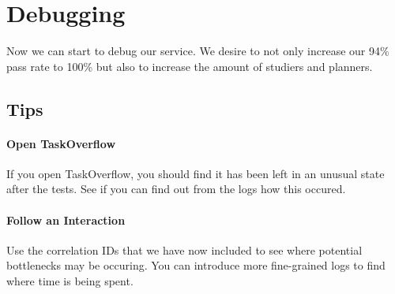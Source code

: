 \documentclass{csse4400}
\begin{document}
\section{Debugging}

Now we can start to debug our service.
We desire to not only increase our 94\% pass rate to 100\% but also to increase the amount of studiers and planners.

\subsection{Tips}

\paragraph{Open TaskOverflow}
If you open TaskOverflow,
you should find it has been left in an unusual state after the tests.
See if you can find out from the logs how this occured.

\paragraph{Follow an Interaction}
Use the correlation IDs that we have now included to see where potential bottlenecks may be occuring.
You can introduce more fine-grained logs to find where time is being spent.

\end{document}
